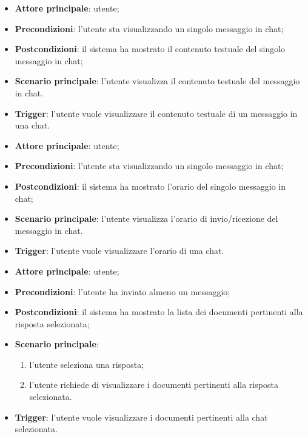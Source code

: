 \documentclass[10pt, a4paper]{article}
\begin{document}
    \begin{itemize}
        \item \textbf{Attore principale}: utente;
        \item \textbf{Precondizioni}: l’utente sta visualizzando un singolo messaggio in chat;
        \item \textbf{Postcondizioni}: il sistema ha mostrato il contenuto testuale del singolo messaggio in chat;
        \item \textbf{Scenario principale}: l’utente visualizza il contenuto testuale del messaggio in chat.
        \item \textbf{Trigger}: l’utente vuole visualizzare il contenuto testuale di un messaggio in una chat.
    \end{itemize}

    \begin{itemize}
        \item \textbf{Attore principale}: utente;
        \item \textbf{Precondizioni}: l’utente sta visualizzando un singolo messaggio in chat;
        \item \textbf{Postcondizioni}: il sistema ha mostrato l'orario del singolo messaggio in chat;
        \item \textbf{Scenario principale}: l’utente visualizza l'orario di invio/ricezione del messaggio in chat.
        \item \textbf{Trigger}: l’utente vuole visualizzare l'orario di una chat.
    \end{itemize}

    \begin{itemize}
        \item \textbf{Attore principale}: utente;
        \item \textbf{Precondizioni}: l’utente ha inviato almeno un messaggio;
        \item \textbf{Postcondizioni}: il sistema ha mostrato la lista dei documenti pertinenti alla risposta selezionata;
        \item \textbf{Scenario principale}:
            \begin{enumerate}
                \item l’utente seleziona una risposta;
                \item l’utente richiede di visualizzare i documenti pertinenti alla risposta selezionata.
            \end{enumerate}
        \item \textbf{Trigger}: l’utente vuole visualizzare i documenti pertinenti alla chat selezionata.
    \end{itemize}
\end{document}
